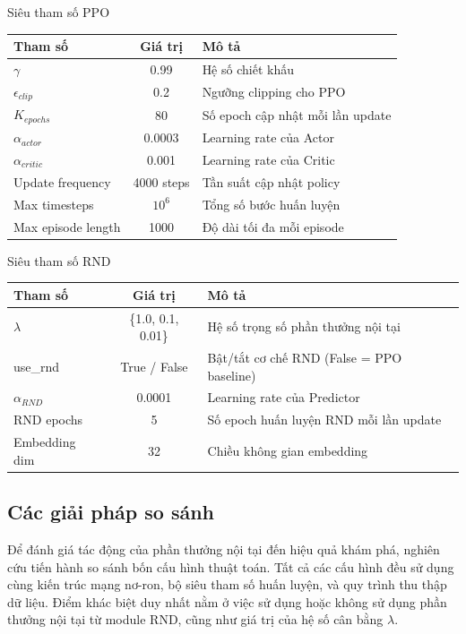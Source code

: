 \documentclass{uetgraduation}
\begin{document}
\begin{table}[H]{Siêu tham số PPO}
\centering
\begin{tabular}{|l|c|l|}
\hline
\textbf{Tham số} & \textbf{Giá trị} & \textbf{Mô tả} \\
\hline
$\gamma$ & 0.99 & Hệ số chiết khấu \\
\hline
$\epsilon_{clip}$ & 0.2 & Ngưỡng clipping cho PPO \\
\hline
$K_{epochs}$ & 80 & Số epoch cập nhật mỗi lần update \\
\hline
$\alpha_{actor}$ & 0.0003 & Learning rate của Actor \\
\hline
$\alpha_{critic}$ & 0.001 & Learning rate của Critic \\
\hline
Update frequency & 4000 steps & Tần suất cập nhật policy \\
\hline
Max timesteps & $10^6$ & Tổng số bước huấn luyện \\
\hline
Max episode length & 1000 & Độ dài tối đa mỗi episode \\
\hline
\end{tabular}
\label{tab:ppo-params}
\end{table}

\begin{table}[H]{Siêu tham số RND}
\centering
\begin{tabular}{|l|c|l|}
\hline
\textbf{Tham số} & \textbf{Giá trị} & \textbf{Mô tả} \\
\hline
$\lambda$ & \{1.0, 0.1, 0.01\} & Hệ số trọng số phần thưởng nội tại \\
\hline
use\_rnd & True / False & Bật/tắt cơ chế RND (False = PPO baseline) \\
\hline
$\alpha_{RND}$ & 0.0001 & Learning rate của Predictor \\
\hline
RND epochs & 5 & Số epoch huấn luyện RND mỗi lần update \\
\hline
Embedding dim & 32 & Chiều không gian embedding \\
\hline
\end{tabular}
\label{tab:rnd-params}
\end{table}

\subsection{Các giải pháp so sánh}

Để đánh giá tác động của phần thưởng nội tại đến hiệu quả khám phá, nghiên cứu tiến hành so sánh bốn cấu hình thuật toán. Tất cả các cấu hình đều sử dụng cùng kiến trúc mạng nơ-ron, bộ siêu tham số huấn luyện, và quy trình thu thập dữ liệu. Điểm khác biệt duy nhất nằm ở việc sử dụng hoặc không sử dụng phần thưởng nội tại từ module RND, cũng như giá trị của hệ số cân bằng $\lambda$.
\end{document}
